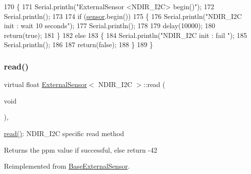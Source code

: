 \begin{DoxyCode}
170     \{
171         Serial.println(\textcolor{stringliteral}{"ExternalSensor <NDIR\_I2C> begin()"});
172         Serial.println();
173 
174          \textcolor{keywordflow}{if} (\hyperlink{classExternalSensor_3_01NDIR__I2C_01_4_ae541c9cece7c38674b70114cdb74a7dc}{sensor}.begin()) 
175         \{
176             Serial.println(\textcolor{stringliteral}{"NDIR\_I2C init : wait 10 seconds"});
177             Serial.println();
178 
179             delay(10000);
180             \textcolor{keywordflow}{return}(\textcolor{keyword}{true});
181             \}
182          \textcolor{keywordflow}{else} 
183         \{
184             Serial.println(\textcolor{stringliteral}{"NDIR\_I2C init : fail "});
185             Serial.println();
186 
187             \textcolor{keywordflow}{return}(\textcolor{keyword}{false});
188         \}   
189     \}
\end{DoxyCode}
\mbox{\label{classExternalSensor_3_01NDIR__I2C_01_4_a239d18652e9fb4673842ae9726edf44f}} 
\subsubsection{\texorpdfstring{read()}{read()}}
{\footnotesize\ttfamily virtual float \hyperlink{classExternalSensor}{External\+Sensor}$<$ N\+D\+I\+R\+\_\+\+I2C $>$\+::read (\begin{DoxyParamCaption}\item[{void}]{ }\end{DoxyParamCaption})\hspace{0.3cm}{\ttfamily [inline]}, {\ttfamily [virtual]}}

\hyperlink{classExternalSensor_3_01NDIR__I2C_01_4_a239d18652e9fb4673842ae9726edf44f}{read()}\+: N\+D\+I\+R\+\_\+\+I2C specific read method

\begin{DoxyReturn}{Returns}
the ppm value if successful, else return -\/42 
\end{DoxyReturn}


Reimplemented from \hyperlink{classBaseExternalSensor_a1564f16deacf57b51b9948ac29db4291}{Base\+External\+Sensor}.



